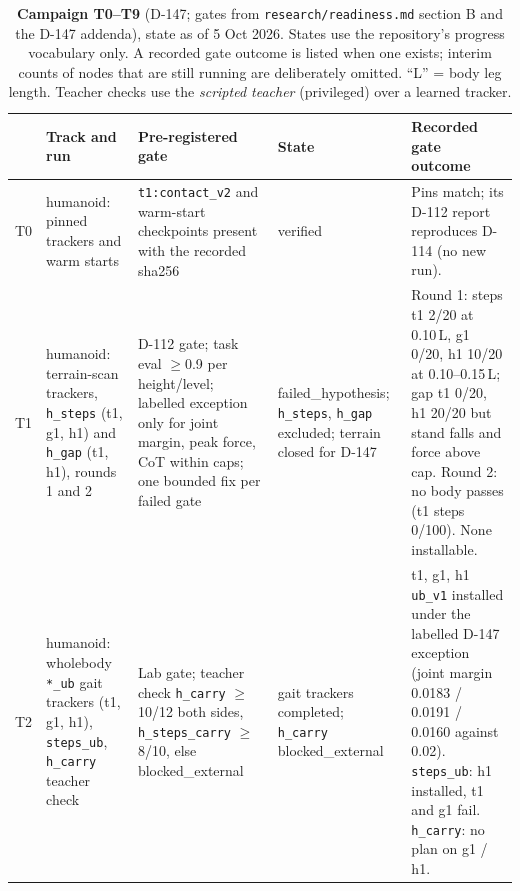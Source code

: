 \documentclass[10pt,twocolumn]{article}
\begin{document}
\providecommand{\st}[1]{{\ttfamily\scriptsize #1}}
\begin{table}[t]\centering\footnotesize
\setlength{\tabcolsep}{3pt}\renewcommand{\arraystretch}{1.08}
\caption{\textbf{Campaign T0--T9} (D-147; gates from \texttt{research/readiness.md} section B and the D-147 addenda), state as of 5 Oct 2026. States use the repository's progress vocabulary only. A recorded gate outcome is listed when one exists; interim counts of nodes that are still \st{running} are deliberately omitted. ``L'' = body leg length. Teacher checks use the \emph{scripted teacher} (privileged) over a learned tracker.}
\label{tab:campaign}
\begin{tabularx}{\textwidth}{@{}l>{\raggedright\arraybackslash}p{3.2cm}>{\raggedright\arraybackslash}p{4.1cm}>{\raggedright\arraybackslash}p{2.9cm}>{\raggedright\arraybackslash}X@{}}
\toprule
 & Track and run & Pre-registered gate & State & Recorded gate outcome \\
\midrule
T0 & humanoid: pinned trackers and warm starts &
\texttt{t1:contact\_v2} and warm-start checkpoints present with the recorded sha256 &
\st{verified} &
Pins match; its D-112 report reproduces D-114 (no new run). \\
\addlinespace
T1 & humanoid: terrain-scan trackers, \texttt{h\_steps} (t1, g1, h1) and \texttt{h\_gap} (t1, h1), rounds 1 and 2 &
D-112 gate; task eval $\ge$0.9 per height/level; labelled exception only for joint margin, peak force, CoT within caps; one bounded fix per failed gate &
\st{failed\_hypothesis}; \texttt{h\_steps}, \texttt{h\_gap} excluded; terrain closed for D-147 &
Round 1: steps t1 2/20 at 0.10\,L, g1 0/20, h1 10/20 at 0.10--0.15\,L; gap t1 0/20, h1 20/20 but stand falls and force above cap. Round 2: no body passes (t1 steps 0/100). None installable. \\
\addlinespace
T2 & humanoid: wholebody \texttt{*\_ub} gait trackers (t1, g1, h1), \texttt{steps\_ub}, \texttt{h\_carry} teacher check &
Lab gate; teacher check \texttt{h\_carry} $\ge$10/12 both sides, \texttt{h\_steps\_carry} $\ge$8/10, else \st{blocked\_external} &
gait trackers \st{completed}; \texttt{h\_carry} \st{blocked\_external} &
t1, g1, h1 \texttt{ub\_v1} installed under the labelled D-147 exception (joint margin 0.0183 / 0.0191 / 0.0160 against 0.02). \texttt{steps\_ub}: h1 installed, t1 and g1 fail. \texttt{h\_carry}: no plan on g1 / h1. \\

\end{tabularx}
\end{table}
\end{document}
